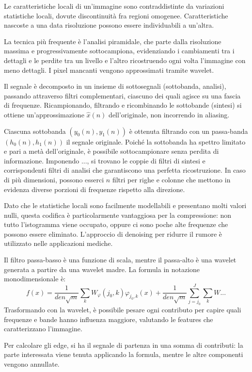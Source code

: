 Le caratteristiche locali di un'immagine sono contraddistinte da variazioni statistiche locali, dovute  discontinuità fra regioni omogenee. Caratteristiche nascoste a una data risoluzione possono essere individuabili a un'altra.

La tecnica più frequente è l'analisi piramidale, che parte dalla risoluzione massima e progressivamente sottocampiona, evidenziando i cambiamenti tra i dettagli e le perdite tra un livello e l'altro ricostruendo ogni volta l'immagine con meno dettagli. I pixel mancanti vengono approssimati tramite wavelet.

Il segnale è decomposto in un insieme di sottosegnali (sottobanda, analisi), passando attraverso filtri complementari, ciascuno dei quali agisce su una fascia di frequenze. Ricampionando, filtrando e ricombinando le sottobande (sintesi) si ottiene un'approssimazione $\hat{x}(n)$ dell'originale, non incorrendo in aliasing. 

Ciascuna sottobanda $(y_0(n), y_1(n))$ è ottenuta filtrando con un passa-banda $(h_0(n), h_1(n))$ il segnale originale. Poiché la sottobanda ha spettro limitato e pari a metà dell'originale, è possibile sottocampionare senza perdita di informazione. 
Imponendo ..., si trovano le coppie di filtri di sintesi e corrispondenti filtri di analisi che garantiscono una perfetta ricostruzione. In caso di più dimensioni, possono esserci $n$ filtri per righe e colonne che mettono in evidenza diverse porzioni di frequenze rispetto alla direzione. 

Dato che le statistiche locali sono facilmente modellabili e presentano molti valori nulli, questa codifica è particolarmente vantaggiosa per la compressione: non tutto l'istogramma viene occupato, oppure ci sono poche alte frequenze che possono essere eliminato. L'approccio di denoising per ridurre il rumore è utilizzato nelle applicazioni mediche.

Il filtro passa-basso è una funzione di scala, mentre il passa-alto è una wavelet generata a partire da una wavelet madre. La formula in notazione monodimensionale è:
$$f(x)  = \frac{1}{den\sqrt{m}} \sum_{k} W_\varphi (j_0, k) \varphi_{j_0, k} (x) + \frac{1}{den\sqrt{m}} \sum_{j=j_0}^{J}\sum_{k} W... $$
Trasformando con la wavelet, è possibile pesare ogni contributo per capire quali frequenze e bande hanno influenza maggiore, valutando le features che caratterizzano l'immagine. 

Per calcolare gli edge, si ha il segnale di partenza in una somma di contributi: la parte interessata viene tenuta applicando la formula, mentre le altre componenti vengono annullate. 

